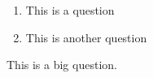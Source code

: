 \documentclass[a4paper,11pt]{article}
\begin{document}
\sloppy
\makeexamcover

\begin{enumerate}
    \item This is a question 
    \item This is another question 
\end{enumerate}

This is a big question. 
\end{document}
